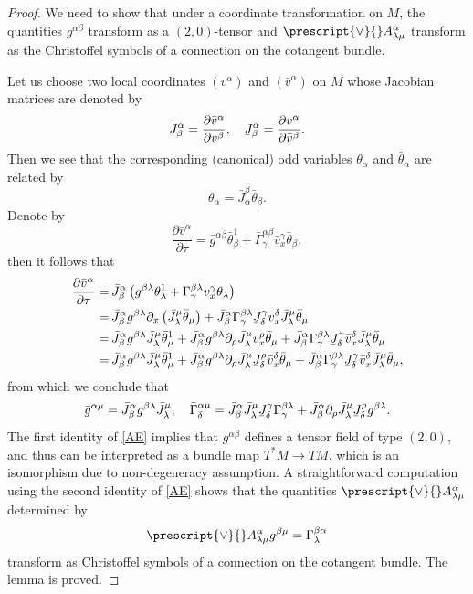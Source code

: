 \documentclass[11pt,a4paper]{amsart}
\numberwithin{equation}{section}
\newcommand{\diff}[2]{\frac{\partial #1}{\partial #2}}
\newcommand{\qa}{\alpha}
\newcommand{\qb}{\beta}
\newcommand{\qd}{\delta}
\newcommand{\qg}{\gamma}
\newcommand{\qt}{\tau}
\newcommand{\qth}{\theta}
\newcommand{\qp}{\partial}
\newcommand{\Qg}{\Gamma}
\newcommand{\ql}{\lambda}
\newcommand{\kk}[1]{\left(#1\right)}
\newcommand{\xb}[1]{\underaccent{\bar}{#1}}
\numberwithin{equation}{section}
\begin{document}
\begin{proof}
  We need to show that under a coordinate transformation on $M$, the quantities $g^{\qa\qb}$ transform as a $(2,0)$-tensor and $\prescript{\vee}{}A^\qa_{\ql\mu}$ transform as the Christoffel symbols of a connection on the cotangent bundle.

  Let us choose two local coordinates $(v^\qa)$ and $(\bar v^\qa)$ on $M$ whose Jacobian matrices are denoted by 
  \[
\bar J^\qa_\qb =\diff{\bar v^\qa}{v^\qb},\quad \xb J^\qa_\qb =\diff{v^\qa}{\bar v^\qb}.
\]
Then we see that the corresponding (canonical) odd variables $\qth_\qa$ and $\bar\qth_\qa$ are related by 
\[
\qth_\qa = \bar J^\qb_\qa\bar\qth_\qb.
\]
Denote by 
\[
\diff{\bar v^\qa}{\qt} = \bar g^{\qa\qb}\bar \qth_\qb^1+\bar \Qg^{\qa\qb}_\qg \bar v^\qg_x\bar \qth_\qb,
\]
then it follows that
\begin{align*}
    \diff{\bar v^\qa}{\qt} =&\,\bar J^\qa_\qb\kk{g^{\qb\ql}\qth_\ql^1+\Qg^{\qb\ql}_\qg v^\qg_x\qth_\ql} \\
    =&\,\bar J^\qa_\qb g^{\qb\ql}\qp_x\kk{\bar J^\mu_\ql\bar\qth_\mu}+ \bar J^\qa_\qb\Qg^{\qb\ql}_\qg \xb J^\qg_\qd \bar v^\qd_x \bar J^\mu_\ql\bar\qth_\mu\\
    =&\, \bar J^\qa_\qb g^{\qb\ql}\bar J^\mu_\ql\bar\qth_\mu^1+\bar J^\qa_\qb g^{\qb\ql}\qp_\rho \bar J^\mu_\ql v^\rho_x\bar\qth_\mu+ \bar J^\qa_\qb\Qg^{\qb\ql}_\qg \xb J^\qg_\qd \bar v^\qd_x \bar J^\mu_\ql\bar\qth_\mu\\
    =&\, \bar J^\qa_\qb g^{\qb\ql}\bar J^\mu_\ql\bar\qth_\mu^1+\bar J^\qa_\qb g^{\qb\ql}\qp_\rho \bar J^\mu_\ql \xb J^\rho_\qd \bar v^\qd_x\bar\qth_\mu+ \bar J^\qa_\qb\Qg^{\qb\ql}_\qg \xb J^\qg_\qd \bar v^\qd_x \bar J^\mu_\ql\bar\qth_\mu,
\end{align*}
from which we conclude that 
\begin{equation}
    \label{AE}
\bar g^{\qa\mu} = \bar J^\qa_\qb g^{\qb\ql}\bar J^\mu_\ql,\quad \bar\Qg^{\qa\mu}_\qd = \bar J^\qa_\qb\bar J^\mu_\ql \xb J^\qg_\qd   \Qg^{\qb\ql}_\qg+\bar J^\qa_\qb \qp_\rho \bar J^\mu_\ql \xb J^\rho_\qd g^{\qb\ql}.
\end{equation}
The first identity of \eqref{AE} implies that $g^{\qa\qb}$ defines a tensor field of type $(2,0)$, and thus can be interpreted as a bundle map $T^*M\to TM$, which is an isomorphism due to non-degeneracy assumption. A straightforward computation using the second identity of \eqref{AE} shows that the quantities $\prescript{\vee}{}A^\qa_{\ql\mu}$ determined by 
\[
\prescript{\vee}{}A^\qa_{\ql\mu}g^{\qb\mu} = \Qg^{\qb\qa}_\ql
\]
transform as Christoffel symbols of a connection on the cotangent bundle. The lemma is proved.
\end{proof}
\end{document}

